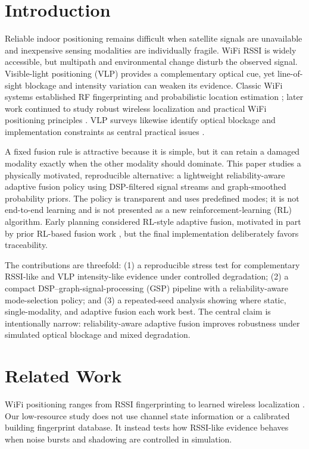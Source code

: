 \documentclass[conference]{IEEEtran}
\begin{document}
\section{Introduction}
Reliable indoor positioning remains difficult when satellite signals are unavailable and inexpensive sensing modalities are individually fragile. WiFi RSSI is widely accessible, but multipath and environmental change disturb the observed signal. Visible-light positioning (VLP) provides a complementary optical cue, yet line-of-sight blockage and intensity variation can weaken its evidence. Classic WiFi systems established RF fingerprinting and probabilistic location estimation \cite{bahl2000radar,youssef2005horus}; later work continued to study robust wireless localization and practical WiFi positioning principles \cite{ayyalasomayajula2020dloc,dai2023wifi}. VLP surveys likewise identify optical blockage and implementation constraints as central practical issues \cite{do2016vlc,luo2017vlpstate,afzalan2019vlp}.

A fixed fusion rule is attractive because it is simple, but it can retain a damaged modality exactly when the other modality should dominate. This paper studies a physically motivated, reproducible alternative: a lightweight reliability-aware adaptive fusion policy using DSP-filtered signal streams and graph-smoothed probability priors. The policy is transparent and uses predefined modes; it is not end-to-end learning and is not presented as a new reinforcement-learning (RL) algorithm. Early planning considered RL-style adaptive fusion, motivated in part by prior RL-based fusion work \cite{salimibeni2022rlfusion}, but the final implementation deliberately favors traceability.

The contributions are threefold: (1) a reproducible stress test for complementary RSSI-like and VLP intensity-like evidence under controlled degradation; (2) a compact DSP--graph-signal-processing (GSP) pipeline with a reliability-aware mode-selection policy; and (3) a repeated-seed analysis showing where static, single-modality, and adaptive fusion each work best. The central claim is intentionally narrow: reliability-aware adaptive fusion improves robustness under simulated optical blockage and mixed degradation.

\section{Related Work}
WiFi positioning ranges from RSSI fingerprinting to learned wireless localization \cite{bahl2000radar,youssef2005horus,ayyalasomayajula2020dloc,dai2023wifi}. Our low-resource study does not use channel state information or a calibrated building fingerprint database. It instead tests how RSSI-like evidence behaves when noise bursts and shadowing are controlled in simulation.
\end{document}

